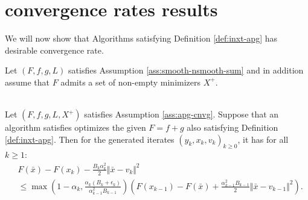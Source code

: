 \documentclass[12pt]{article}
\begin{document}
\section{convergence rates results}
    We will now show that Algorithms satisfying Definition \ref{def:inxt-apg} has desirable convergence rate. 
    \begin{assumption}\label{ass:apg-cnvg}
        Let $(F, f, g, L)$ satisfies Assumption \ref{ass:smooth-nsmooth-sum} and in addition assume that $F$ admits a set of non-empty minimizers $X^+$. 
    \end{assumption}
    \begin{lemma}\;\label{lemma:inxt-apg-onestep}\\
        Let $(F, f, g, L, X^+)$ satisfies Assumption \ref{ass:apg-cnvg}. 
        Suppose that an algorithm satisfies optimizes the given $F =f + g$ also satisfying Definition \ref{def:inxt-apg}.
        Then for the generated iterates $(y_k, x_k, v_k)_{k \ge 0}$, it has for all $k \ge 1$: 
        \begin{align*}
            &F(\bar x) - F(x_k)  - \frac{B_k\alpha_k^2}{2}\Vert \bar x - v_k\Vert^2
            \\
            &\le 
            \max\left(
                1 - \alpha_k, 
                \frac{\alpha_k(B_k + \epsilon_k)}{\alpha_{k -1}^2B_{k - 1}}
            \right)
            \left(
                F(x_{k - 1}) - F(\bar x) 
                + \frac{\alpha_{k - 1}^2B_{k - 1}}{2}\Vert \bar x - v_{k - 1} \Vert^2
            \right). 
        \end{align*}
    \end{lemma}
\end{document}
